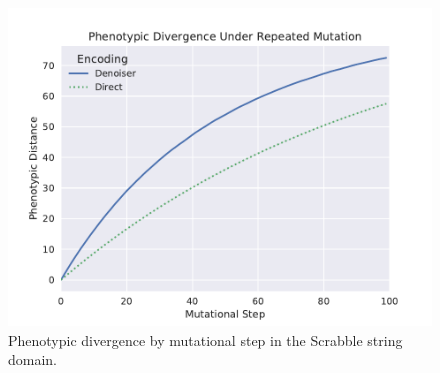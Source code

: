 \begin{figure}
  \includegraphics[width=\linewidth]{img/scrabble_dist_vs_step}
  \caption{Phenotypic divergence by mutational step in the Scrabble string domain.}
  \label{fig:scrabble_dist_vs_step}
\end{figure}
